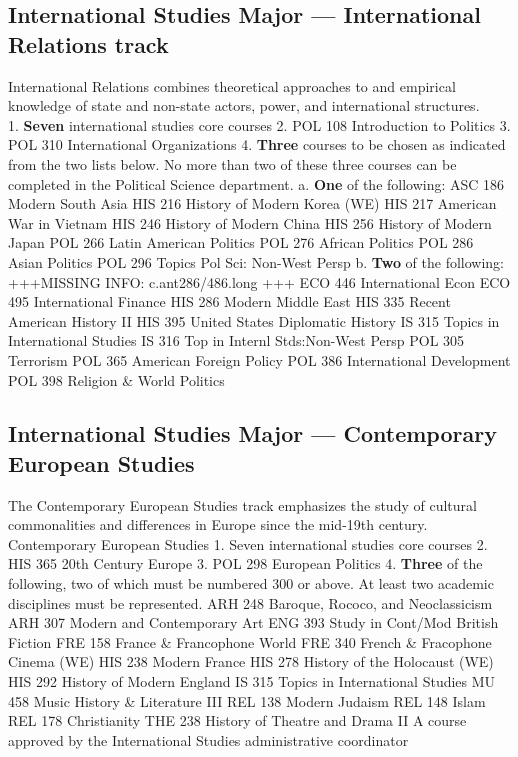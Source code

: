 \documentclass[
  letterpaper,
]{scrbook}
\begin{document}
\hypertarget{international-studies-major-international-relations-track}{%
\subsection{International Studies Major --- International Relations
track}\label{international-studies-major-international-relations-track}}

International Relations combines theoretical approaches to and empirical
knowledge of state and non-state actors, power, and international
structures.\\
1. \textbf{Seven} international studies core courses 2. POL 108
Introduction to Politics 3. POL 310 International Organizations 4.
\textbf{Three} courses to be chosen as indicated from the two lists
below. No more than two of these three courses can be completed in the
Political Science department. a. \textbf{One} of the following: ASC 186
Modern South Asia HIS 216 History of Modern Korea (WE) HIS 217 American
War in Vietnam HIS 246 History of Modern China HIS 256 History of Modern
Japan POL 266 Latin American Politics POL 276 African Politics POL 286
Asian Politics POL 296 Topics Pol Sci: Non-West Persp b. \textbf{Two} of
the following: +++MISSING INFO: c.ant286/486.long +++ ECO 446
International Econ ECO 495 International Finance HIS 286 Modern Middle
East HIS 335 Recent American History II HIS 395 United States Diplomatic
History IS 315 Topics in International Studies IS 316 Top in Internl
Stds:Non-West Persp POL 305 Terrorism POL 365 American Foreign Policy
POL 386 International Development POL 398 Religion \& World Politics

\hypertarget{international-studies-major-contemporary-european-studies}{%
\subsection{International Studies Major --- Contemporary European
Studies}\label{international-studies-major-contemporary-european-studies}}

The Contemporary European Studies track emphasizes the study of cultural
commonalities and differences in Europe since the mid-19th century.
Contemporary European Studies 1. Seven international studies core
courses 2. HIS 365 20th Century Europe 3. POL 298 European Politics 4.
\textbf{Three} of the following, two of which must be numbered 300 or
above. At least two academic disciplines must be represented. ARH 248
Baroque, Rococo, and Neoclassicism ARH 307 Modern and Contemporary Art
ENG 393 Study in Cont/Mod British Fiction FRE 158 France \& Francophone
World FRE 340 French \& Fracophone Cinema (WE) HIS 238 Modern France HIS
278 History of the Holocaust (WE) HIS 292 History of Modern England IS
315 Topics in International Studies MU 458 Music History \& Literature
III REL 138 Modern Judaism REL 148 Islam REL 178 Christianity THE 238
History of Theatre and Drama II A course approved by the International
Studies administrative coordinator
\end{document}
